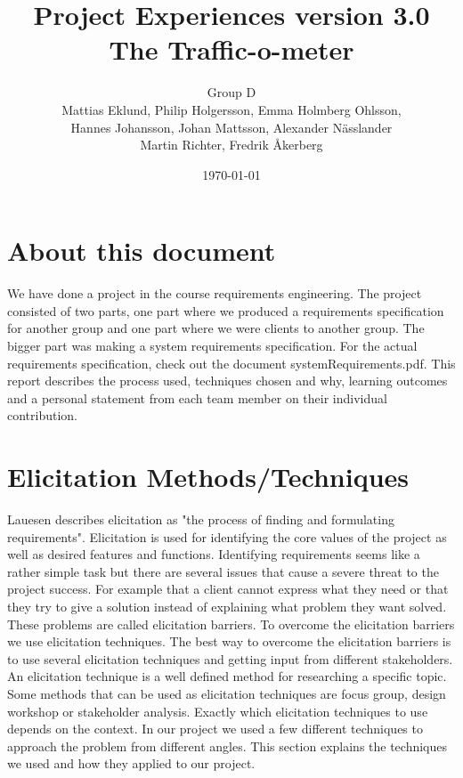 \documentclass[a4paper]{article}
\title{Project Experiences version 3.0 \\ The Traffic-o-meter}
\author{Group D\\ Mattias Eklund, Philip Holgersson, Emma Holmberg Ohlsson,\\ Hannes Johansson, Johan Mattsson, Alexander Nässlander\\Martin Richter, Fredrik Åkerberg}
\date{\today}
\begin{document}
	\maketitle
	\thispagestyle{empty}
	\pagestyle{empty}
	\newpage
	\clearpage
	\tableofcontents
	\newpage
	\setcounter{page}{1}

\pagestyle{fancy}
\renewcommand{\headrulewidth}{0.4pt}
\renewcommand{\footrulewidth}{0.4pt}


	
	\section{About this document}
We have done a project in the course requirements engineering. The project consisted of two parts, one part where we produced a requirements specification for another group and one part where we were clients to another group. The bigger part was making a system requirements specification. For the actual requirements specification, check out the document systemRequirements.pdf. This report describes the process used, techniques chosen and why, learning outcomes and a personal statement from each team member on their individual contribution.

	\section{Elicitation Methods/Techniques}
Lauesen describes elicitation as "the process of finding and formulating requirements". Elicitation is used for identifying the core values of the project as well as desired features and functions. Identifying requirements seems like a rather simple task but there are several issues that cause a severe threat to the project success. For example that a client cannot express what they need or that they try to give a solution instead of explaining what problem they want solved. These problems are called elicitation barriers. To overcome the elicitation barriers we use elicitation techniques. The best way to overcome the elicitation barriers is to use several elicitation techniques and getting input from different stakeholders. An elicitation technique is a well defined method for researching a specific topic. Some methods that can be used as elicitation techniques are focus group, design workshop or stakeholder analysis. Exactly which elicitation techniques to use depends on the context. In our project we used a few different techniques to approach the problem from different angles. This section explains the techniques we used and how they applied to our project.
\end{document}
